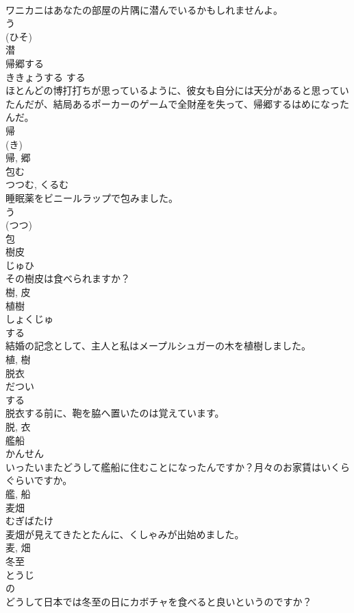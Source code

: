 \documentclass[8pt]{extreport}
\begin{document}
\begin{CJK}{UTF8}{min}
\\	ワニカニはあなたの部屋の片隅に潜んでいるかもしれませんよ。	
\\	う 
\\	(ひそ) 
\\	潜	
\\	帰郷する	
\\	ききょうする	する 
\\	ほとんどの博打打ちが思っているように、彼女も自分には天分があると思っていたんだが、結局あるポーカーのゲームで全財産を失って、帰郷するはめになったんだ。	
\\	帰 
\\	(き) 
\\	帰, 郷	
\\	包む	
\\	つつむ, くるむ	
\\	睡眠薬をビニールラップで包みました。	
\\	う 
\\	(つつ) 
\\	包	
\\	樹皮	
\\	じゅひ	
\\	その樹皮は食べられますか？	
\\	樹, 皮	
\\	植樹	
\\	しょくじゅ	
\\	する 
\\	結婚の記念として、主人と私はメープルシュガーの木を植樹しました。	
\\	植, 樹	
\\	脱衣	
\\	だつい	
\\	する 
\\	脱衣する前に、鞄を脇へ置いたのは覚えています。	
\\	脱, 衣	
\\	艦船	
\\	かんせん	
\\	いったいまたどうして艦船に住むことになったんですか？月々のお家賃はいくらぐらいですか。	
\\	艦, 船	
\\	麦畑	
\\	むぎばたけ	
\\	麦畑が見えてきたとたんに、くしゃみが出始めました。	
\\	麦, 畑	
\\	冬至	
\\	とうじ	
\\	の 
\\	どうして日本では冬至の日にカボチャを食べると良いというのですか？	

\end{CJK}
\end{document}
